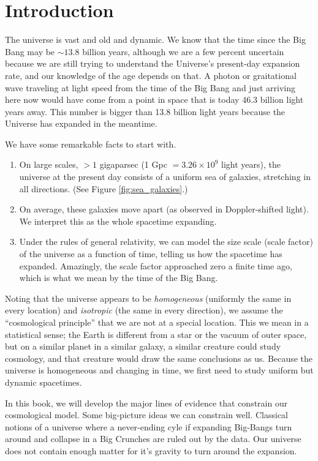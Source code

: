  {}\chapter*{Introduction}

The universe is vast and old and dynamic.  We know that the time since the Big Bang may be $\sim 13.8$ billion years, although we are a few percent uncertain because we are still trying to understand the Universe's present-day expansion rate, and our knowledge of the age depends on that.  A photon or graitational wave traveling at light speed from the time of the Big Bang and just arriving here now would have come from a point in space that is today 46.3 billion light years away.  This number is bigger than 13.8 billion light years because the Universe has expanded in the meantime.  

We have some remarkable facts to start with.
\begin{enumerate}
  \item On large scales, $>1$ gigaparsec (1 Gpc $= 3.26\times 10^9$ light years), the universe at the present day consists of a uniform sea of galaxies, stretching in all directions. (See Figure \ref{fig:sea_galaxies}.)
  \item On average, these galaxies move apart (as observed in Doppler-shifted light).  We interpret this as the whole spacetime expanding.
  \item Under the rules of general relativity, we can model the size scale ({scale factor}) of the universe as a function of time, telling us how the spacetime has expanded.  Amazingly, the scale factor approached zero a finite time ago, which is what we mean by the time of the Big Bang.
\end{enumerate}
 
Noting that the universe appears to be \textit{homogeneous} (uniformly the same in every location) and \textit{isotropic} (the same in every direction), we assume the ``cosmological principle'' that we are not at a special location.  This we mean in a statistical sense; the Earth is different from a star or the vacuum of outer space, but on a similar planet in a similar galaxy, a similar creature could study cosmology, and that creature would draw the same conclusions as us.  Because the universe is homogeneous and changing in time, we first need to study uniform but dynamic spacetimes.

In this book, we will develop the major lines of evidence that constrain our cosmological model.  Some big-picture ideas we can constrain well.  Classical notions of a universe where a never-ending cyle if expanding Big-Bangs turn around and collapse in a Big Crunches are ruled out by the data.  Our universe does not contain enough matter for it's gravity to turn around the expansion.

